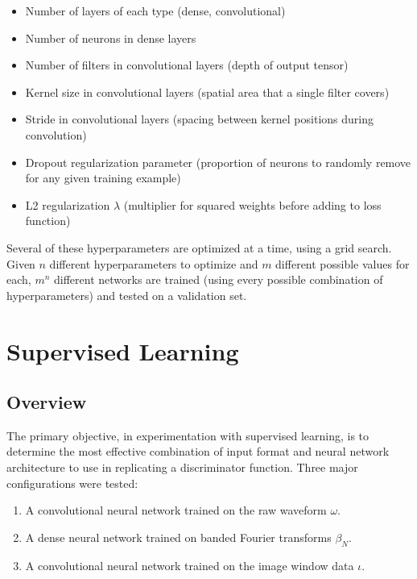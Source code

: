 \documentclass[10pt]{article}
\begin{document}
\begin{itemize}
    \item Number of layers of each type (dense, convolutional)
    \item Number of neurons in dense layers
    \item Number of filters in convolutional layers (depth of output tensor)
    \item Kernel size in convolutional layers (spatial area that a single filter covers)
    \item Stride in convolutional layers (spacing between kernel positions during convolution)
    \item Dropout regularization parameter (proportion of neurons to randomly remove for any given training example)
    \item L2 regularization $\lambda$ (multiplier for squared weights before adding to loss function)
\end{itemize}

Several of these hyperparameters are optimized at a time, using a grid search. Given $n$ different hyperparameters to optimize and $m$ different possible values for each, $m^n$ different networks are trained (using every possible combination of hyperparameters) and tested on a validation set.

\section{Supervised Learning}

\subsection{Overview}

The primary objective, in experimentation with supervised learning, is to determine the most effective combination of input format and neural network architecture to use in replicating a discriminator function. Three major configurations were tested:

\begin{enumerate}
    \item A convolutional neural network trained on the raw waveform $\omega$.
    \item A dense neural network trained on banded Fourier transforms $\beta_{N}$.
    \item A convolutional neural network trained on the image window data $\iota$.
\end{enumerate}
\end{document}
